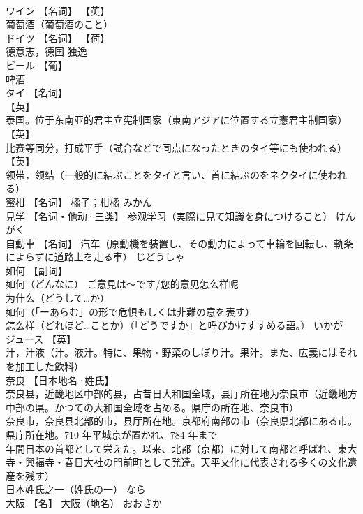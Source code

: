 \documentclass[8pt]{extreport}
\begin{document}
\begin{CJK}{UTF8}{min}
\\	ワイン	【名词】 【英】
\\	葡萄酒（葡萄酒のこと）		
\\	ドイツ	【名词】 【荷】
\\	德意志，德国		独逸
\\	ビール	【葡】
\\	啤酒		
\\	タイ	【名词】 
\\	【英】
\\	泰国。位于东南亚的君主立宪制国家（東南アジアに位置する立憲君主制国家） 
\\	【英】
\\	比赛等同分，打成平手（試合などで同点になったときのタイ等にも使われる） 
\\	【英】
\\	领带，领结（一般的に結ぶことをタイと言い、首に結ぶのをネクタイに使われる）		
\\	蜜柑	【名词】 橘子；柑橘	みかん	
\\	見学	【名词・他动·三类】 参观学习（実際に見て知識を身につけること）	けんがく	
\\	自動車	【名词】 汽车（原動機を装置し、その動力によって車輪を回転し、軌条によらずに道路上を走る車）	じどうしゃ	
\\	如何	【副词】 
\\	如何（どんなに） ご意見は〜です/您的意见怎么样呢 
\\	为什么（どうして…か） 
\\	如何（「ーあらむ」の形で危惧もしくは非難の意を表す） 
\\	怎么样（どれほど…ことか）（「どうですか」と呼びかけすすめる語。）	いかが	
\\	ジュース	【英】
\\	汁，汁液（汁。液汁。特に、果物・野菜のしぼり汁。果汁。また、広義にはそれを加工した飲料）		
\\	奈良	【日本地名·姓氏】 
\\	奈良县，近畿地区中部的县，占昔日大和国全域，县厅所在地为奈良市（近畿地方中部の県。かつての大和国全域を占める。県庁の所在地、奈良市） 
\\	奈良市，奈良县北部的市，县厅所在地。京都府南部の市（奈良県北部にある市。県庁所在地。710 年平城京が置かれ、784 年まで 
\\	年間日本の首都として栄えた。以来、北都（京都）に対して南都と呼ばれ、東大寺・興福寺・春日大社の門前町として発達。天平文化に代表される多くの文化遺産を残す） 
\\	日本姓氏之一（姓氏の一）	なら	
\\	大阪	【名】 大阪（地名）	おおさか	

\end{CJK}
\end{document}
